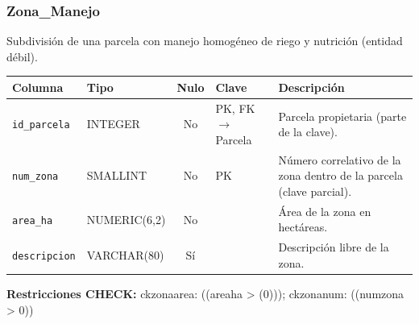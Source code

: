 \documentclass[11pt,letterpaper]{article}
\newcommand{\tbus}{\textunderscore\allowbreak}
\newcommand{\tb}[1]{{\ttfamily\let\_\tbus #1}}
\begin{document}
\subsubsection*{Zona\_Manejo}
Subdivisión de una parcela con manejo homogéneo de riego y nutrición (entidad débil).
{\footnotesize
\begin{longtable}{>{\raggedright\arraybackslash}p{3.3cm}>{\raggedright\arraybackslash}p{2.5cm}c>{\raggedright\arraybackslash}p{2.2cm}>{\raggedright\arraybackslash}p{6.1cm}}
\toprule
\textbf{Columna} & \textbf{Tipo} & \textbf{Nulo} & \textbf{Clave} & \textbf{Descripción} \\
\midrule
\endhead
\texttt{id\_parcela} & INTEGER & No & PK, FK $\to$ Parcela & Parcela propietaria (parte de la clave). \\
\texttt{num\_zona} & SMALLINT & No & PK & Número correlativo de la zona dentro de la parcela (clave parcial). \\
\texttt{area\_ha} & NUMERIC(6,2) & No &  & Área de la zona en hectáreas. \\
\texttt{descripcion} & VARCHAR(80) & Sí &  & Descripción libre de la zona. \\
\bottomrule
\end{longtable}}
{\footnotesize\textbf{Restricciones CHECK:} \tb{ck\_zona\_area}: \tb{((area\_ha > (0)))}; \tb{ck\_zona\_num}: \tb{((num\_zona > 0))}\par}
\medskip
\end{document}
